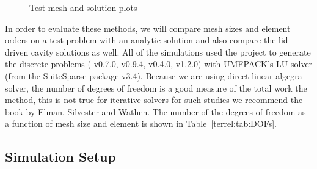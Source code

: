 \begin{figure}[ht]
{\label{terrel:fig:vel_test}
}
\qquad
{}
\label{terrel:fig:meshsolution}
\caption{Test mesh and solution plots}
\end{figure}

In order to evaluate these methods, we will compare mesh sizes and element
orders on a test problem with an analytic solution and also compare the lid
driven cavity solutions as well.  All of the simulations used the \fenics{}
project to generate the discrete problems (\ffc{} v0.7.0,\dolfin{} v0.9.4,
\ufl{} v0.4.0, \ufc{} v1.2.0) with {UMFPACK}'s LU solver (from the
{SuiteSparse} package v3.4).  Because we are using direct linear
algegra solver, the number of degrees of freedom is a good measure of the total
work the method, this is not true for iterative solvers for such studies we
recommend the book by Elman, Silvester and Wathen\cite{ElmanEtAl2005}.  The
number of the degrees of freedom as a function of mesh size and element is
shown in Table~\ref{terrel:tab:DOFs}.

\subsection{Simulation Setup}

